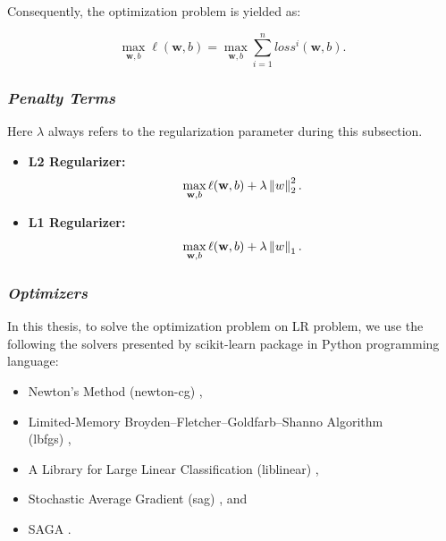 Consequently, the optimization problem is yielded as:

\begin{equation}
\label{lr_optimization} 
\max_{\textbf{w}, b} \ell(\textbf{w}, b) = \max_{\textbf{w}, b} \sum_{i=1}^{n} loss^{i}(\textbf{w}, b).
\end{equation}

\subsubsection*{\textit{Penalty Terms}}
Here $\lambda$ always refers to the regularization parameter during this subsection.

\begin{itemize}
    \item \textbf{L2 Regularizer:}
        \begin{equation}
        \label{lr_l1} 
        \max_{\textbf{w}, b} \ell(\textbf{w}, b) + \lambda \left\lVert w\right\rVert_{2}^{2}.
        \end{equation}
    \item \textbf{L1 Regularizer:}
        \begin{equation}
        \label{lr_l1} 
        \max_{\textbf{w}, b} \ell(\textbf{w}, b) + \lambda \left\lVert w\right\rVert_{1}.
        \end{equation}
\end{itemize}

\subsubsection*{\textit{Optimizers}}

In this thesis, to solve the optimization problem on LR problem, we use the following the solvers presented by scikit-learn package \cite{scikit-learn} in Python programming language:

\begin{itemize}
    \item Newton’s Method (newton-cg) \cite{lr_newton_cg}, 
    
    \item Limited-Memory Broyden–Fletcher–Goldfarb–Shanno Algorithm \\(lbfgs) \cite{lr_lbfgsb},
    
    \item A Library for Large Linear Classification (liblinear) \cite{lr_liblinear},
    
    \item Stochastic Average Gradient (sag) \cite{lr_sag}, and
    
    \item SAGA \cite{lr_saga}.
\end{itemize}

